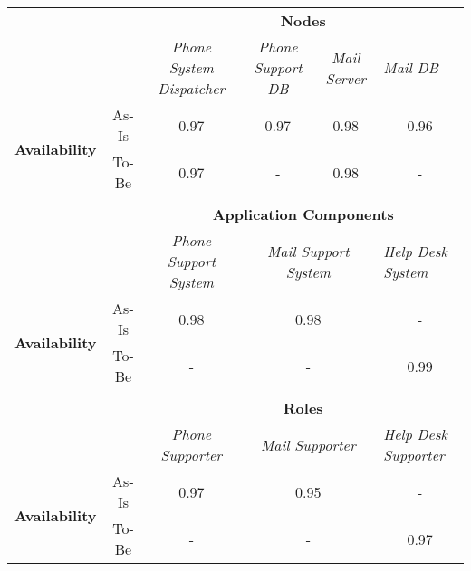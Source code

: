 \begin{table}[H]
	\centering
	\begin{tabular}{|c|c|p{2cm}|p{2.5cm}|p{2.5cm}|p{2.5cm}|}
		\cline{3-6}

		\multicolumn{2}{c}{} & \multicolumn{4}{|c|}{\textbf{Nodes}} \\ \cline{3-6}
		\multicolumn{2}{c|}{} & \multicolumn{1}{c|}{\textsl{Phone System Dispatcher}} & \multicolumn{1}{c|}{\textsl{Phone Support DB}} & \multicolumn{1}{c|}{\textsl{Mail Server}} & \multicolumn{1}{p{2cm}|}{\textsl{Mail DB}}\\
		\hline
		\multirow{2}{*}{\textbf{Availability}} & As-Is & \multicolumn{1}{c|}{0.97} & \multicolumn{1}{c|}{0.97} & \multicolumn{1}{c|}{0.98} &  \multicolumn{1}{c|}{0.96}\\ \cline{2-6}
										& To-Be &\multicolumn{1}{c|}{0.97} & \multicolumn{1}{c|}{-}& \multicolumn{1}{c|}{0.98} & \multicolumn{1}{c|}{-}\\ \hline

		\multicolumn{6}{c}{} \\ \cline{3-6}							
		\multicolumn{2}{c}{} & \multicolumn{4}{|c|}{\textbf{Application Components}} \\ \cline{3-6}
		\multicolumn{2}{c|}{} & \multicolumn{1}{c|}{\textsl{Phone Support System}} & \multicolumn{2}{c|}{\textsl{Mail Support System}} & \multicolumn{1}{p{2cm}|}{\textsl{Help Desk System}}\\
		\hline
		\multirow{2}{*}{\textbf{Availability}} & As-Is & \multicolumn{1}{c|}{0.98} & \multicolumn{2}{c|}{0.98} & \multicolumn{1}{c|}{-}\\ \cline{2-6}
										& To-Be &\multicolumn{1}{c|}{-} & \multicolumn{2}{c|}{-} & \multicolumn{1}{c|}{0.99}\\ \hline

	   \multicolumn{6}{c}{} \\ \cline{3-6}
		\multicolumn{2}{c}{} & \multicolumn{4}{|c|}{\textbf{Roles}} \\ \cline{3-6}
		\multicolumn{2}{c|}{} & \multicolumn{1}{|c|}{\textsl{Phone Supporter}} & \multicolumn{2}{|c|}{\textsl{Mail Supporter}}& \multicolumn{1}{|p{2cm}|}{\textsl{Help Desk Supporter}}\\ \hline
		\multirow{2}{*}{\textbf{Availability}} & As-Is & \multicolumn{1}{|c|}{0.97}& \multicolumn{2}{|c|}{0.95}& \multicolumn{1}{|c|}{-}\\ \cline{2-6}
		& To-Be & \multicolumn{1}{|c|}{-}  & \multicolumn{2}{|c|}{-} & \multicolumn{1}{|c|}{0.97}\\ \hline


\end{tabular}
\end{table}
